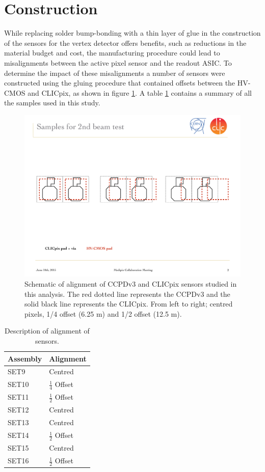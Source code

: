 \section{Construction}
While replacing solder bump-bonding with a thin layer of glue in the construction of the sensors for the vertex detector offers benefits, such as reductions in the material budget and cost, the manufacturing procedure could lead to misalignments between the active pixel sensor and the readout ASIC.  To determine the impact of these misalignments a number of sensors were constructed using the gluing procedure that contained offsets between the HV-CMOS and CLICpix, as shown in figure \ref{fig:alignment}.  A table \ref{table:alignment} contains a summary of all the samples used in this study.

\begin{figure}
\centering
\includegraphics[width=1.0\textwidth]{CLICdpVertex/Plots/misalignedPads.pdf}
\caption[Schematic of alignment of CCPDv3 and CLICpix sensors studied in this analysis.]{Schematic of alignment of CCPDv3 and CLICpix sensors studied in this analysis.  The red dotted line represents the CCPDv3 and the solid black line represents the CLICpix.  From left to right; centred pixels, 1/4 offset (6.25 {\mu}m) and 1/2 offset (12.5 {\mu}m).}
\label{fig:alignment}
\end{figure}

\begin{table}[h!]
\centering
\begin{tabular}{ l l }
\hline
Assembly & Alignment \\ 
\hline
SET9 & Centred \\
SET10 & $\frac{1}{4}$ Offset \\
SET11 & $\frac{1}{2}$ Offset \\
SET12 & Centred \\
SET13 & Centred \\
SET14 & $\frac{1}{2}$ Offset \\
SET15 & Centred \\
SET16 & $\frac{1}{2}$ Offset \\
\hline
\end{tabular}
\caption[Description of alignment of sensors.]{Description of alignment of sensors.}
\label{table:alignment}
\end{table}

